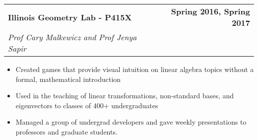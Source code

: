 \documentclass[letterpaper]{article}
\newenvironment{details}
{\begin{itemize}}
{\end{itemize}}
\begin{document}
  \noindent
  \begin{tabularx}{\textwidth}{@{}X r@{}}
  \textbf{Illinois Geometry Lab - P415X} & \textbf{Spring 2016, Spring 2017} \\
  \textit{Prof Cary Malkewicz and Prof Jenya Sapir}
  \end{tabularx}
  \begin{details}
    \item Created games that provide visual intuition on linear algebra topics without a formal, mathematical introduction
    \item Used in the teaching of linear transformations, non-standard bases, and eigenvectors to classes of 400+ undergraduates
    \item Managed a group of undergrad developers and gave weekly presentations to professors and graduate students.
  \end{details}

\end{document}
